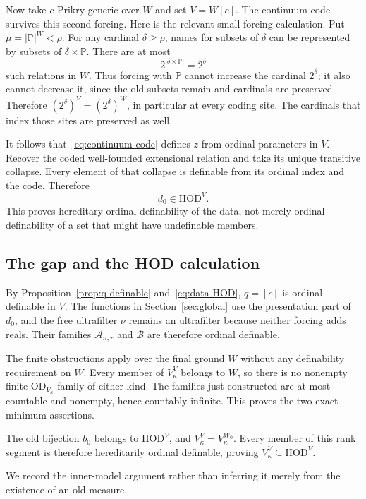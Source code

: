 \documentclass[11pt,letterpaper]{article}
\theoremstyle{definition}
\numberwithin{equation}{section}
\newcommand{\HOD}{\mathrm{HOD}}
\newcommand{\OD}{\mathrm{OD}}
\newcommand{\PP}{\mathbb P}
\begin{document}
Now take $c$ Prikry generic over $W$ and set $V=W[c]$. The continuum code survives this second forcing. Here is the relevant small-forcing calculation. Put $\mu=|\PP|^W<\rho$. For any cardinal $\delta\geq\rho$, names for subsets of $\delta$ can be represented by subsets of $\delta\times\PP$. There are at most
\[
2^{|\delta\times\PP|}=2^\delta
\]
such relations in $W$. Thus forcing with $\PP$ cannot increase the cardinal $2^\delta$; it also cannot decrease it, since the old subsets remain and cardinals are preserved. Therefore $(2^\delta)^V=(2^\delta)^W$, in particular at every coding site. The cardinals that index those sites are preserved as well.

It follows that~\eqref{eq:continuum-code} defines $z$ from ordinal parameters in $V$. Recover the coded well-founded extensional relation and take its unique transitive collapse. Every element of that collapse is definable from its ordinal index and the code. Therefore
\begin{equation}\label{eq:data-HOD}
d_0\in\HOD^V.
\end{equation}
This proves hereditary ordinal definability of the data, not merely ordinal definability of a set that might have undefinable members.

\subsection{The gap and the HOD calculation}

By Proposition~\ref{prop:q-definable} and~\eqref{eq:data-HOD}, $q=[c]$ is ordinal definable in $V$. The functions in Section~\ref{sec:global} use the presentation part of $d_0$, and the free ultrafilter $\nu$ remains an ultrafilter because neither forcing adds reals. Their families $\mathcal A_{n,r}$ and $\mathcal B$ are therefore ordinal definable.

The finite obstructions apply over the final ground $W$ without any definability requirement on $W$. Every member of $V_\kappa^V$ belongs to $W$, so there is no nonempty finite $\OD_{V_\kappa}$ family of either kind. The families just constructed are at most countable and nonempty, hence countably infinite. This proves the two exact minimum assertions.

The old bijection $b_0$ belongs to $\HOD^V$, and $V_\kappa^V=V_\kappa^{W_0}$. Every member of this rank segment is therefore hereditarily ordinal definable, proving $V_\kappa^V\subseteq\HOD^V$.

We record the inner-model argument rather than inferring it merely from the existence of an old measure.
\end{document}
